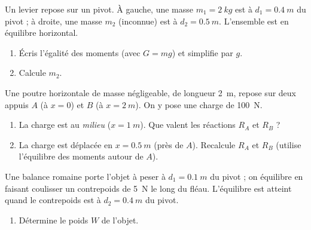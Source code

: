 \documentclass[11pt,a4paper]{article}
\begin{document}
\begin{exo}
Un levier repose sur un pivot. À gauche, une masse $m_1=\qty{2}{kg}$ est à $d_1=\qty{0.4}{m}$ du
pivot ; à droite, une masse $m_2$ (inconnue) est à $d_2=\qty{0.5}{m}$. L'ensemble est en équilibre
horizontal.
\begin{enumerate}[label=\alph*)]
  \item Écris l'égalité des moments (avec $G=mg$) et simplifie par $g$.
  \item Calcule $m_2$.
\end{enumerate}
\end{exo}

\begin{exo}
Une poutre horizontale de masse négligeable, de longueur \qty{2}{m}, repose sur deux appuis $A$ (à
$x=0$) et $B$ (à $x=\qty{2}{m}$). On y pose une charge de \qty{100}{N}.
\begin{enumerate}[label=\alph*)]
  \item La charge est au \emph{milieu} ($x=\qty{1}{m}$). Que valent les réactions $R_A$ et $R_B$ ?
  \item La charge est déplacée en $x=\qty{0.5}{m}$ (près de $A$). Recalcule $R_A$ et $R_B$ (utilise
        l'équilibre des moments autour de $A$).
\end{enumerate}
\end{exo}

\begin{exo}
Une balance romaine porte l'objet à peser à $d_1=\qty{0.1}{m}$ du pivot ; on équilibre en faisant
coulisser un contrepoids de \qty{5}{N} le long du fléau. L'équilibre est atteint quand le contrepoids
est à $d_2=\qty{0.4}{m}$ du pivot.
\begin{center}
\end{center}
\begin{enumerate}[label=\alph*)]
  \item Détermine le poids $W$ de l'objet.
\end{enumerate}
\end{exo}
\end{document}

